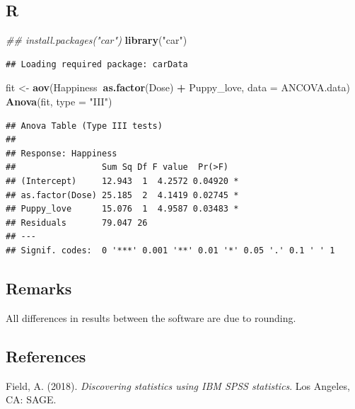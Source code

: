 \documentclass[
]{book}
\newenvironment{Shaded}{\begin{snugshade}}{\end{snugshade}}
\newcommand{\CommentTok}[1]{\textcolor[rgb]{0.56,0.35,0.01}{\textit{#1}}}
\newcommand{\DataTypeTok}[1]{\textcolor[rgb]{0.13,0.29,0.53}{#1}}
\newcommand{\KeywordTok}[1]{\textcolor[rgb]{0.13,0.29,0.53}{\textbf{#1}}}
\newcommand{\NormalTok}[1]{#1}
\newcommand{\OperatorTok}[1]{\textcolor[rgb]{0.81,0.36,0.00}{\textbf{#1}}}
\newcommand{\StringTok}[1]{\textcolor[rgb]{0.31,0.60,0.02}{#1}}
\begin{document}
\hypertarget{r-5}{%
\subsection{R}\label{r-5}}

\begin{Shaded}
\begin{Highlighting}[]
\CommentTok{## install.packages("car")}
\KeywordTok{library}\NormalTok{(}\StringTok{"car"}\NormalTok{)}
\end{Highlighting}
\end{Shaded}

\begin{verbatim}
## Loading required package: carData
\end{verbatim}

\begin{Shaded}
\begin{Highlighting}[]
\NormalTok{fit <-}\StringTok{ }\KeywordTok{aov}\NormalTok{(Happiness}\OperatorTok{~}\KeywordTok{as.factor}\NormalTok{(Dose) }\OperatorTok{+}\StringTok{ }\NormalTok{Puppy_love, }\DataTypeTok{data =}\NormalTok{ ANCOVA.data)}
\KeywordTok{Anova}\NormalTok{(fit, }\DataTypeTok{type =} \StringTok{"III"}\NormalTok{)}
\end{Highlighting}
\end{Shaded}

\begin{verbatim}
## Anova Table (Type III tests)
## 
## Response: Happiness
##                 Sum Sq Df F value  Pr(>F)  
## (Intercept)     12.943  1  4.2572 0.04920 *
## as.factor(Dose) 25.185  2  4.1419 0.02745 *
## Puppy_love      15.076  1  4.9587 0.03483 *
## Residuals       79.047 26                  
## ---
## Signif. codes:  0 '***' 0.001 '**' 0.01 '*' 0.05 '.' 0.1 ' ' 1
\end{verbatim}

\hypertarget{remarks-5}{%
\subsection{Remarks}\label{remarks-5}}

All differences in results between the software are due to rounding.

\hypertarget{references-5}{%
\subsection{References}\label{references-5}}

Field, A. (2018). \emph{Discovering statistics using IBM SPSS statistics}. Los Angeles, CA: SAGE.
\end{document}
